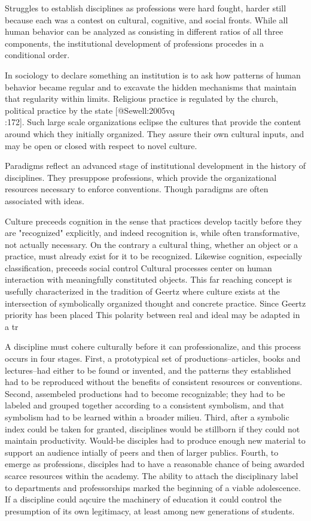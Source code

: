 Struggles to establish disciplines as professions were hard fought,
harder still because each was a contest on cultural, cognitive, and
social fronts. While all human behavior can be analyzed as consisting in
different ratios of all three components, the institutional development
of professions procedes in a conditional order.

In sociology to declare something an institution is to ask how patterns
of human behavior became regular and to excavate the hidden mechanisms
that maintain that regularity within limits. Religious practice is
regulated by the church, political practice by the state
[@Sewell:2005vq\\:172]. Such large scale organizations eclipse the
cultures that provide the content around which they initially organized.
They assure their own cultural inputs, and may be open or closed with
respect to novel culture.

Paradigms reflect an advanced stage of institutional development in the
history of disciplines. They presuppose professions, which provide the
organizational resources necessary to enforce conventions. Though
paradigms are often associated with ideas.

Culture preceeds cognition in the sense that practices develop tacitly
before they are "recognized" explicitly, and indeed recognition is,
while often transformative, not actually necessary. On the contrary a
cultural thing, whether an object or a practice, must already exist for
it to be recognized. Likewise cognition, especially classification,
preceeds social control Cultural processes center on human interaction
with meaningfully constituted objects. This far reaching concept is
usefully characterized in the tradition of Geertz where culture exists
at the intersection of symbolically organized thought and concrete
practice. Since Geertz priority has been placed This polarity between
real and ideal may be adapted in a tr

A discipline must cohere culturally before it can professionalize, and
this process occurs in four stages. First, a prototypical set of
productions--articles, books and lectures--had either to be found or
invented, and the patterns they established had to be reproduced without
the benefits of consistent resources or conventions. Second, assembeled
productions had to become recognizable; they had to be labeled and
grouped together according to a consistent symbolism, and that symbolism
had to be learned within a broader milieu. Third, after a symbolic index
could be taken for granted, disciplines would be stillborn if they could
not maintain productivity. Would-be disciples had to produce enough new
material to support an audience intially of peers and then of larger
publics. Fourth, to emerge as professions, disciples had to have a
reasonable chance of being awarded scarce resources within the academy.
The ability to attach the disciplinary label to departments and
professorships marked the beginning of a viable adolescence. If a
discipline could aqcuire the machinery of education it could control the
presumption of its own legitimacy, at least among new generations of
students.

